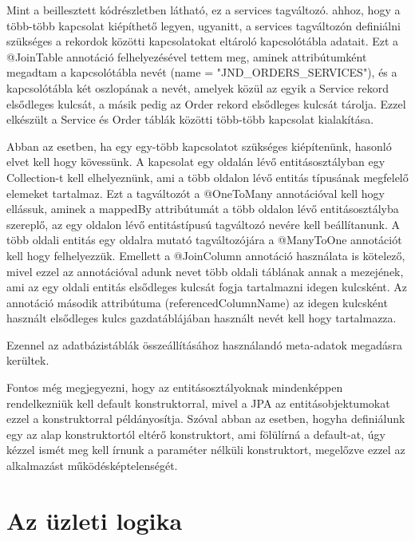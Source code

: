 \documentclass[centeredchapter]{thesis-ekf}
\theoremstyle{definition}
\theoremstyle{remark}
\begin{document}
\hypertarget{figure-order-entity}{}


Mint a beillesztett kódrészletben látható, ez a services tagváltozó. ahhoz, hogy a több-több kapcsolat kiépíthető legyen, ugyanitt, a services tagváltozón definiálni szükséges a rekordok közötti kapcsolatokat eltároló kapcsolótábla adatait. Ezt a @JoinTable annotáció felhelyezésével tettem meg, aminek attribútumként megadtam a kapcsolótábla nevét (name = "JND\_ORDERS\_SERVICES"), és a kapcsolótábla két oszlopának a nevét, amelyek közül az egyik a Service rekord elsődleges kulcsát, a másik pedig az Order rekord elsődleges kulcsát tárolja. Ezzel elkészült a Service és Order táblák közötti több-több kapcsolat kialakítása.

Abban az esetben, ha egy egy-több kapcsolatot szükséges kiépítenünk, hasonló elvet kell hogy kövessünk. A kapcsolat egy oldalán lévő entitásosztályban egy Collection-t kell elhelyeznünk, ami a több oldalon lévő entitás típusának megfelelő elemeket tartalmaz. Ezt a tagváltozót a @OneToMany annotációval kell hogy ellássuk, aminek a mappedBy attribútumát a több oldalon lévő entitásosztályba szereplő, az egy oldalon lévő entitástípusú tagváltozó nevére kell beállítanunk. 
A több oldali entitás egy oldalra mutató tagváltozójára a @ManyToOne annotációt kell hogy felhelyezzük. Emellett a @JoinColumn annotáció használata is kötelező, mivel ezzel az annotációval adunk nevet több oldali táblának annak a mezejének, ami az egy oldali entitás elsődleges kulcsát fogja tartalmazni idegen kulcsként. Az annotáció második attribútuma (referencedColumnName) az idegen kulcsként használt elsődleges kulcs gazdatáblájában használt nevét kell hogy tartalmazza.

Ezennel az adatbázistáblák összeállításához használandó meta-adatok megadásra kerültek.

Fontos még megjegyezni, hogy az entitásosztályoknak mindenképpen rendelkezniük kell default konstruktorral, mivel a JPA az entitásobjektumokat ezzel a konstruktorral példányosítja. Szóval abban az esetben, hogyha definiálunk egy az alap konstruktortól eltérő konstruktort, ami fölülírná a default-at, úgy kézzel ismét meg kell írnunk a paraméter nélküli konstruktort, megelőzve ezzel az alkalmazást működésképtelenségét. 

\section{Az üzleti logika}
\end{document}
